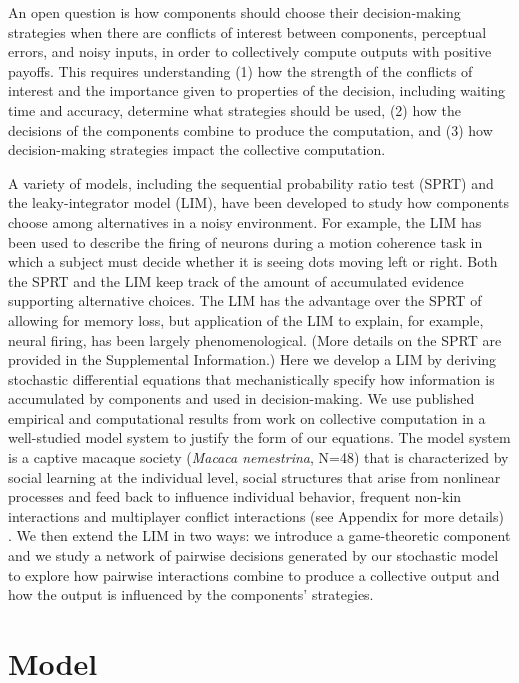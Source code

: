 \documentclass{pnastwo}
\begin{document}
\begin{article}
An open question is how components should choose their decision-making strategies when there are conflicts of interest between components, perceptual errors, and noisy inputs, in order to collectively compute outputs with positive payoffs. This requires understanding (1) how the strength of the  conflicts of interest and the importance given to properties of the decision, including waiting time and accuracy, determine what strategies should be used, (2) how the decisions of the components combine to produce the computation, and (3) how decision-making strategies impact the collective computation. 

A variety of models, including the sequential probability ratio test (SPRT) and the leaky-integrator model (LIM), have been developed to study how components choose among alternatives in a noisy environment. For example, the LIM has been used to describe the firing of neurons during a motion coherence task in which a subject must decide whether it is seeing dots moving left or right. Both the SPRT and the LIM keep track of the amount of accumulated evidence supporting alternative choices. The LIM has the advantage over the SPRT of allowing for memory loss, but application of the LIM to explain, for example, neural firing, has been largely phenomenological. (More details on the SPRT are provided in the Supplemental Information.) Here we develop a LIM by deriving stochastic differential equations that mechanistically specify how information is accumulated by components and used in decision-making. We use published empirical and computational results from work on collective computation in a well-studied model system to justify the form of our equations. The model system is a captive macaque society (\emph{Macaca nemestrina}, N=48) that is characterized by 
social learning at the individual level, social structures that arise from nonlinear processes and feed back to influence individual behavior, frequent non-kin interactions and multiplayer conflict interactions 
(see Appendix for more details) \cite {Flack:2007kx, Flack:2006fk, Flack:2006uq, Flack:2005uq, Flack:2005dg, Thierry:2004tj}. We then extend the LIM in two ways: we introduce a game-theoretic component and we study a network of pairwise decisions generated by our stochastic model to explore how pairwise interactions combine to produce a collective output and how the output is influenced by the components' strategies. 

\section{Model}

\end{article}
\end{document}
